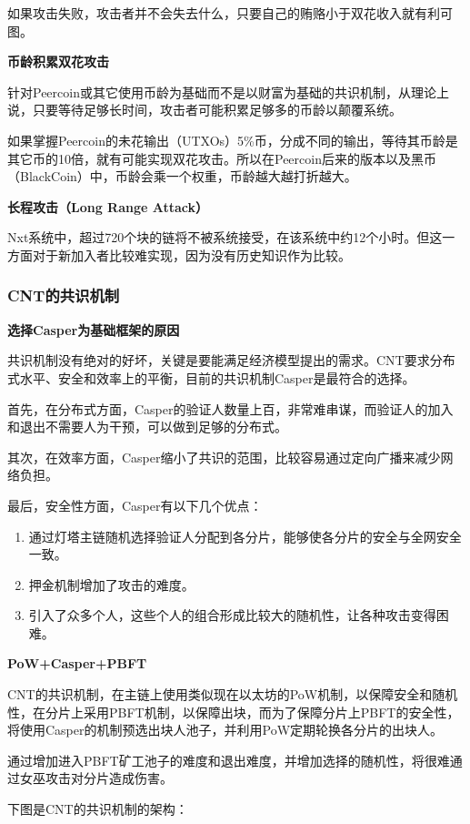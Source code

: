 \documentclass[a4paper,12pt]{article}
\begin{document}
如果攻击失败，攻击者并不会失去什么，只要自己的贿赂小于双花收入就有利可图。

\textbf{币龄积累双花攻击}

针对Peercoin或其它使用币龄为基础而不是以财富为基础的共识机制，从理论上说，只要等待足够长时间，攻击者可能积累足够多的币龄以颠覆系统。

如果掌握Peercoin的未花输出（UTXOs）5\%币，分成不同的输出，等待其币龄是其它币的10倍，就有可能实现双花攻击。所以在Peercoin后来的版本以及黑币（BlackCoin）中，币龄会乘一个权重，币龄越大越打折越大。

\textbf{长程攻击（Long Range Attack）}

Nxt系统中，超过720个块的链将不被系统接受，在该系统中约12个小时。但这一方面对于新加入者比较难实现，因为没有历史知识作为比较。


\subsubsection{CNT的共识机制}

\textbf{选择Casper为基础框架的原因}

共识机制没有绝对的好坏，关键是要能满足经济模型提出的需求。CNT要求分布式水平、安全和效率上的平衡，目前的共识机制Casper是最符合的选择。

首先，在分布式方面，Casper的验证人数量上百，非常难串谋，而验证人的加入和退出不需要人为干预，可以做到足够的分布式。

其次，在效率方面，Casper缩小了共识的范围，比较容易通过定向广播来减少网络负担。

最后，安全性方面，Casper有以下几个优点：
\begin{enumerate}
\item 通过灯塔主链随机选择验证人分配到各分片，能够使各分片的安全与全网安全一致。
\item 押金机制增加了攻击的难度。
\item 引入了众多个人，这些个人的组合形成比较大的随机性，让各种攻击变得困难。
\end{enumerate}

\textbf{PoW+Casper+PBFT}

CNT的共识机制，在主链上使用类似现在以太坊的PoW机制，以保障安全和随机性，在分片上采用PBFT机制，以保障出块，而为了保障分片上PBFT的安全性，将使用Casper的机制预选出块人池子，并利用PoW定期轮换各分片的出块人。

通过增加进入PBFT矿工池子的难度和退出难度，并增加选择的随机性，将很难通过女巫攻击对分片造成伤害。

下图是CNT的共识机制的架构：
\end{document}
